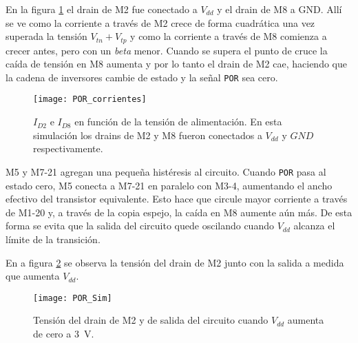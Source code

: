 En la figura \ref{fig:PORCorrientes} el drain de M2 fue conectado a 
\(V_{dd}\) y el drain de M8 a GND. Allí se ve como la corriente a 
través de M2 crece de forma cuadrática una vez superada la tensión 
\(V_{tn}+V_{tp}\) y como la corriente a través de M8 comienza a crecer 
antes, pero con un \emph{beta} menor. Cuando se supera el punto de 
cruce la caída de tensión en M8 aumenta y por lo tanto el drain de M2 
cae, haciendo que la cadena de inversores cambie de estado y la señal 
\lstinline{POR} sea cero.

\begin{figure}
	\centering
	\texttt{[image: POR\_corrientes]}
	\caption{\(I_{D2}\) e \(I_{D8}\) en función de la tensión de 
	alimentación. En esta simulación los drains de M2 y M8 
	fueron conectados a \(V_{dd}\) y \(GND\) respectivamente.}
	\label{fig:PORCorrientes}
\end{figure}

M5 y M7-21 agregan una pequeña histéresis al circuito. Cuando 
\lstinline{POR} pasa al estado cero, M5 conecta a M7-21 en paralelo 
con M3-4, aumentando el ancho efectivo del transistor equivalente. 
Esto hace que circule mayor corriente a través de M1-20 y, a través 
de la copia espejo, la caída en M8 aumente aún más. De esta forma se 
evita que la salida del circuito quede oscilando cuando \(V_{dd}\) 
alcanza el límite de la transición.

En a figura \ref{fig:PORTensiones} se observa la tensión del drain 
de M2 junto con la salida a medida que aumenta \(V_{dd}\).

\begin{figure}
	\centering
	\texttt{[image: POR\_Sim]}
	\caption{Tensión del drain de M2 y de salida del circuito cuando 
	\(V_{dd}\) aumenta de cero a \SI{3}{\volt}.}
	\label{fig:PORTensiones}
\end{figure}
